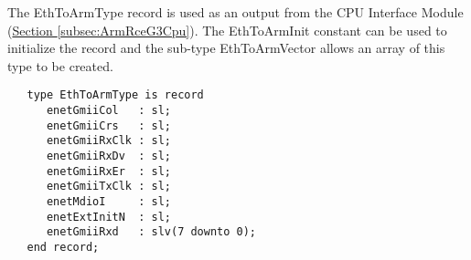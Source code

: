 \documentclass[11pt]{article}
\begin{document}
The EthToArmType record is used as an output from the CPU Interface Module (\hyperref[subsec:ArmRceG3Cpu]{Section \ref*{subsec:ArmRceG3Cpu}}).
The EthToArmInit constant can be used to initialize the record and the sub-type EthToArmVector allows an array of this type to be created.

\small
\begin{verbatim}
   type EthToArmType is record
      enetGmiiCol   : sl;
      enetGmiiCrs   : sl;
      enetGmiiRxClk : sl;
      enetGmiiRxDv  : sl;
      enetGmiiRxEr  : sl;
      enetGmiiTxClk : sl;
      enetMdioI     : sl;
      enetExtInitN  : sl;
      enetGmiiRxd   : slv(7 downto 0);  
   end record;
\end{verbatim}
\normalsize
\end{document}
